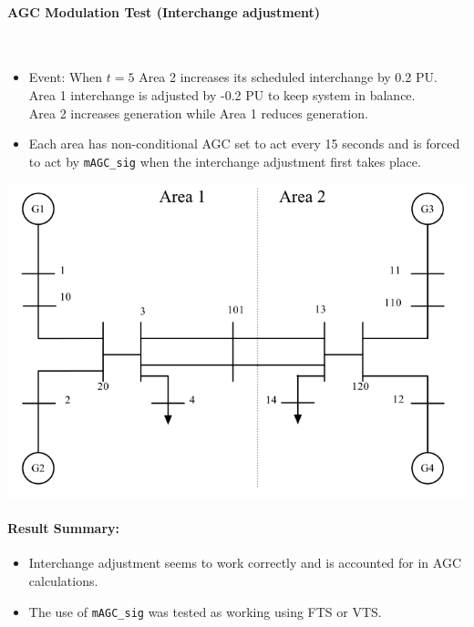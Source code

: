 \documentclass[12pt]{article}
\begin{document}
\onehalfspacing
\paragraph{AGC Modulation Test (Interchange adjustment) } \ \\

\begin{minipage}{0.5\linewidth}
\begin{itemize}
\raggedright
\item Event: When $t=5$ Area 2 increases its scheduled interchange by 0.2 PU.\\
Area 1 interchange is adjusted by -0.2 PU to keep system in balance.\\
Area 2 increases generation while Area 1 reduces generation.

\item Each area has non-conditional AGC set to act every 15 seconds and is forced to act by \verb|mAGC_sig| when the interchange adjustment first takes place.

\end{itemize}
\vfill
\end{minipage}\hspace{2em}%
\begin{minipage}{0.4\linewidth}
\centering
\includegraphics[width=\linewidth]{sysOneLineAreas}
\end{minipage}%


\paragraph{Result Summary:}
\begin{itemize}
\item Interchange adjustment seems to work correctly and is accounted for in AGC calculations.
\item The use of \verb|mAGC_sig| was tested as working using FTS or VTS.
\end{itemize}
\end{document}
